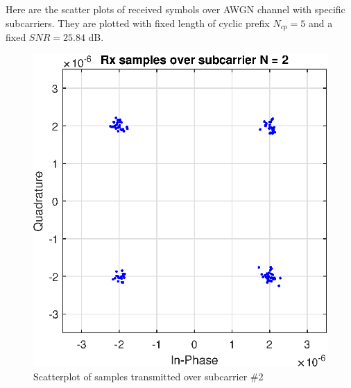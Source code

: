 \documentclass[conference]{IEEEtran}
\begin{document}
 \clearpage
\begin{appendices}
\section{}
Here are the scatter plots of received symbols over AWGN channel with specific subcarriers. They are plotted with fixed length of cyclic prefix $N_{cp} = 5$ and a fixed $SNR = 25.84$ dB.
\label{SCA_AWGN}
\begin{figure}[H]
    \centering
    \includegraphics[width=\linewidth]{images/AWGNN2.eps}
    \caption{Scatterplot of samples transmitted over subcarrier \#2}
    \label{AWGN2}
\end{figure}


\end{appendices}
\end{document}
